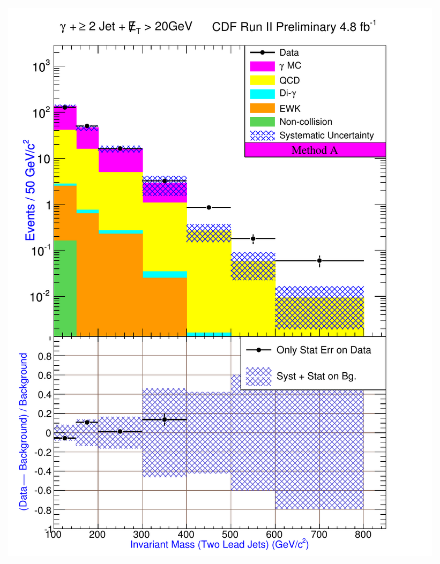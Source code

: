 \documentclass[12pt,twoside,letterpaper,doublespace]{article}
\begin{document}
\begin{figure}[h!]
{\includegraphics[keepaspectratio=true, scale=\figScale]{G30JetsMet20_MtdA_plot2_InvMass_j1j2.pdf}}

\end{figure}
\end{document}
